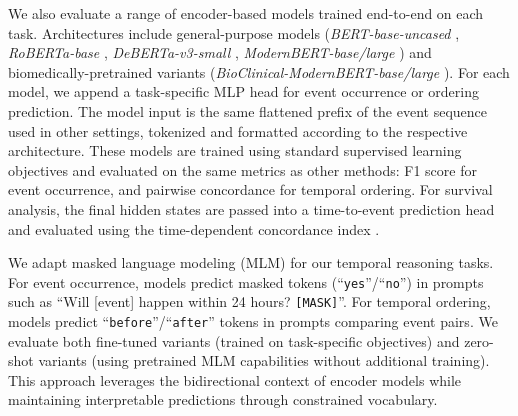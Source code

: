 We also evaluate a range of encoder-based models trained end-to-end on each task. 
Architectures include general-purpose models (\textit{BERT-base-uncased} \citep{devlin2019bert}, \textit{RoBERTa-base} \citep{liu2019roberta}, \textit{DeBERTa-v3-small} \citep{he2021debertav3}, \textit{ModernBERT-base/large} \citep{warner2024smarter}) and biomedically-pretrained variants (\textit{BioClinical-ModernBERT-base/large} \citep{sounack2025bioclinical}).
For each model, we append a task-specific MLP head for event occurrence or ordering prediction. 
The model input is the same flattened prefix of the event sequence used in other settings, tokenized and formatted according to the respective architecture. 
These models are trained using standard supervised learning objectives and evaluated on the same metrics as other methods: F1 score for event occurrence, and pairwise concordance for temporal ordering. 
For survival analysis, the final hidden states are passed into a time-to-event prediction head and evaluated using the time-dependent concordance index \citep{ch07:antolini2005time}.

We adapt masked language modeling (MLM) for our temporal reasoning tasks.
For event occurrence, models predict masked tokens (``\texttt{yes}''/``\texttt{no}'') in prompts such as ``Will [event] happen within 24 hours? \texttt{[MASK]}''.
For temporal ordering, models predict ``\texttt{before}''/``\texttt{after}'' tokens in prompts comparing event pairs.
We evaluate both fine-tuned variants (trained on task-specific objectives) and zero-shot variants (using pretrained MLM capabilities without additional training).
This approach leverages the bidirectional context of encoder models while maintaining interpretable predictions through constrained vocabulary.

